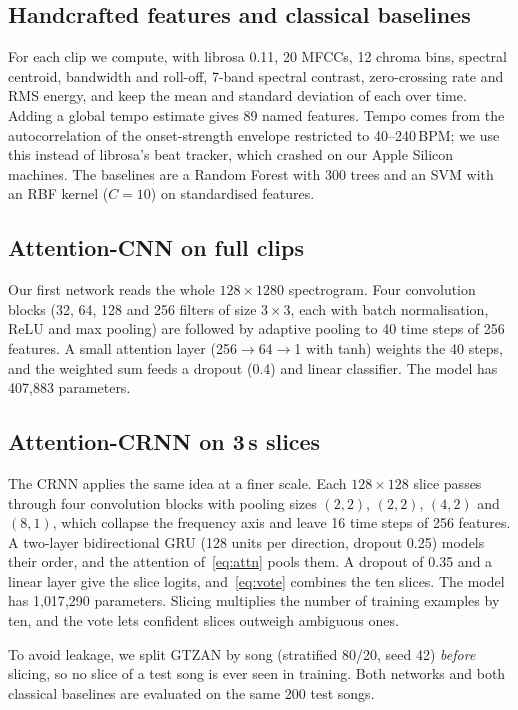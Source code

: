 \documentclass[conference]{IEEEtran}
\begin{document}
\subsection{Handcrafted features and classical baselines}
For each clip we compute, with librosa 0.11, 20 MFCCs, 12 chroma bins, spectral centroid, bandwidth and roll-off, 7-band spectral contrast, zero-crossing rate and RMS energy, and keep the mean and standard deviation of each over time. Adding a global tempo estimate gives 89 named features. Tempo comes from the autocorrelation of the onset-strength envelope restricted to 40--240\,BPM; we use this instead of librosa's beat tracker, which crashed on our Apple Silicon machines. The baselines are a Random Forest with 300 trees and an SVM with an RBF kernel ($C=10$) on standardised features.

\subsection{Attention-CNN on full clips}
Our first network reads the whole $128\times1280$ spectrogram. Four convolution blocks (32, 64, 128 and 256 filters of size $3\times3$, each with batch normalisation, ReLU and max pooling) are followed by adaptive pooling to 40 time steps of 256 features. A small attention layer (256$\to$64$\to$1 with tanh) weights the 40 steps, and the weighted sum feeds a dropout (0.4) and linear classifier. The model has 407{,}883 parameters.

\subsection{Attention-CRNN on 3\,s slices}
The CRNN applies the same idea at a finer scale. Each $128\times128$ slice passes through four convolution blocks with pooling sizes $(2,2)$, $(2,2)$, $(4,2)$ and $(8,1)$, which collapse the frequency axis and leave 16 time steps of 256 features. A two-layer bidirectional GRU (128 units per direction, dropout 0.25) models their order, and the attention of~\eqref{eq:attn} pools them. A dropout of 0.35 and a linear layer give the slice logits, and~\eqref{eq:vote} combines the ten slices. The model has 1{,}017{,}290 parameters. Slicing multiplies the number of training examples by ten, and the vote lets confident slices outweigh ambiguous ones.

To avoid leakage, we split GTZAN by song (stratified 80/20, seed 42) \emph{before} slicing, so no slice of a test song is ever seen in training. Both networks and both classical baselines are evaluated on the same 200 test songs.
\end{document}
